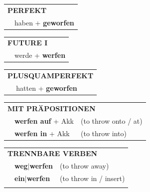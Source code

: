 \documentclass[10pt,a4paper]{revtex4-2}
\begin{document}
\begin{verbbox}
    \vspace{10pt}

 \begin{tabular}{rl}
     \multicolumn{2}{l}{\textbf{PERFEKT}}\\
   & haben + \textbf{geworfen}\\
  \end{tabular}
\hfill
   \begin{tabular}{rl}
    \multicolumn{2}{l}{\textbf{FUTURE I} }\\
   & werde + \textbf{werfen}\\
  \end{tabular}
\hfill
   \begin{tabular}{rl}
      \multicolumn{2}{l}{\textbf{PLUSQUAMPERFEKT}}\\
   & hatten + \textbf{geworfen}\\
  \end{tabular}

   \vspace{10pt}

   \begin{tabular}{lll}
      \multicolumn{3}{l}{\textbf{MIT PRÄPOSITIONEN}}\\
& \textbf{werfen auf} + Akk & (to throw onto / at)\\
& \textbf{werfen in} + Akk & (to throw into)\\
\end{tabular}
  \hfill
   \begin{tabular}{lll}
      \multicolumn{3}{l}{\textbf{TRENNBARE VERBEN}}\\
 & \textbf{weg$|$werfen} & (to throw away)\\
 & \textbf{ein$|$werfen} & (to throw in / insert)\\
\vspace{10pt}
  \end{tabular}

  \vspace{-5pt}

\end{verbbox}
\end{document}
